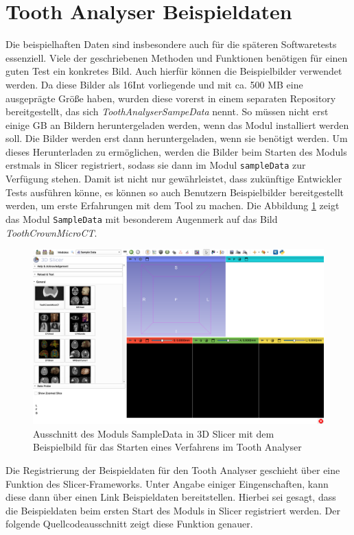 \section{Tooth Analyser Beispieldaten}
\label{sec:beispieldaten} Die beispielhaften Daten sind insbesondere auch für die
späteren Softwaretests essenziell. Viele der geschriebenen Methoden und
Funktionen benötigen für einen guten Test ein konkretes Bild. Auch hierfür können
die Beispielbilder verwendet werden. Da diese Bilder als \ac{16Int} vorliegende und
mit ca. 500 \ac{MB} eine ausgeprägte Größe haben, wurden diese vorerst in einem
separaten Repository bereitgestellt, das sich \textit{ToothAnalyserSampeData}
nennt. So müssen nicht erst einige \ac{GB} an Bildern heruntergeladen werden, wenn
das Modul installiert werden soll. Die Bilder werden erst dann heruntergeladen, wenn
sie benötigt werden. Um dieses Herunterladen zu ermöglichen, werden die Bilder beim
Starten des Moduls erstmals in Slicer registriert, sodass sie dann im Modul
\texttt{sampleData} zur Verfügung stehen. Damit ist nicht nur gewährleistet, dass
zukünftige Entwickler Tests ausführen könne, es können so auch Benutzern
Beispielbilder bereitgestellt werden, um erste Erfahrungen mit dem Tool zu machen.
Die Abbildung \ref{fig:sample_data} zeigt das Modul \texttt{SampleData} mit besonderem
Augenmerk auf das Bild \textit{ToothCrownMicroCT}.

\begin{figure}[h]
	\centering
	\includegraphics[width=1\textwidth]{img/sampleData.png}
	\caption{Ausschnitt des Moduls SampleData in 3D Slicer mit dem Beispielbild
	für das Starten eines Verfahrens im Tooth Analyser}
	\label{fig:sample_data}
\end{figure}

Die Registrierung der Beispieldaten für den Tooth Analyser geschieht über eine Funktion
des Slicer-Frameworks. Unter Angabe einiger Eingenschaften, kann diese dann über
einen Link Beispieldaten bereitstellen. Hierbei sei gesagt, dass die Beispieldaten
beim ersten Start des Moduls in Slicer registriert werden. Der folgende
Quellcodeausschnitt zeigt diese Funktion genauer.

